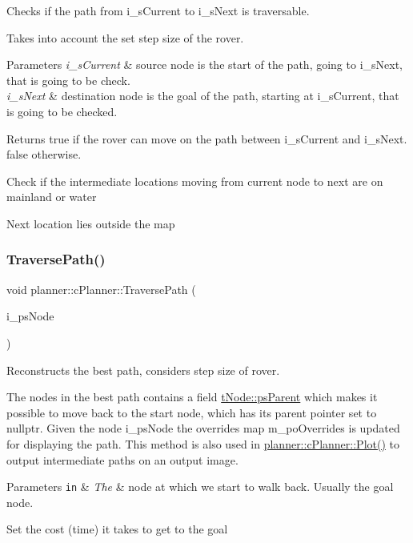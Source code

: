 Checks if the path from i\+\_\+s\+Current to i\+\_\+s\+Next is traversable. 

Takes into account the set step size of the rover.


\begin{DoxyParams}{Parameters}
{\em i\+\_\+s\+Current} & source node is the start of the path, going to i\+\_\+s\+Next, that is going to be check. \\
\hline
{\em i\+\_\+s\+Next} & destination node is the goal of the path, starting at i\+\_\+s\+Current, that is going to be checked. \\
\hline
\end{DoxyParams}
\begin{DoxyReturn}{Returns}
true if the rover can move on the path between i\+\_\+s\+Current and i\+\_\+s\+Next. false otherwise. 
\end{DoxyReturn}
Check if the intermediate locations moving from current node to next are on mainland or water

Next location lies outside the map \mbox{\label{classplanner_1_1c_planner_a8624cb2afb8f2fd216c38b4424013178}} 
\subsubsection{\texorpdfstring{Traverse\+Path()}{TraversePath()}}
{\footnotesize\ttfamily void planner\+::c\+Planner\+::\+Traverse\+Path (\begin{DoxyParamCaption}\item[{std\+::shared\+\_\+ptr$<$ \mbox{\hyperlink{structplanner_1_1t_node}{t\+Node}} $>$ \&}]{i\+\_\+ps\+Node }\end{DoxyParamCaption})}



Reconstructs the best path, considers step size of rover. 

The nodes in the best path contains a field \mbox{\hyperlink{structplanner_1_1t_node_a297a5f7f75357b7a2eb2728ad452ff98}{t\+Node\+::ps\+Parent}} which makes it possible to move back to the start node, which has its parent pointer set to nullptr. Given the node i\+\_\+ps\+Node the overrides map m\+\_\+po\+Overrides is updated for displaying the path. This method is also used in \mbox{\hyperlink{classplanner_1_1c_planner_a236a68e02c7a99323f2d30b3097aa767}{planner\+::c\+Planner\+::\+Plot()}} to output intermediate paths on an output image. 
\begin{DoxyParams}[1]{Parameters}
\mbox{\tt in}  & {\em The} & node at which we start to walk back. Usually the goal node. \\
\hline
\end{DoxyParams}
Set the cost (time) it takes to get to the goal

